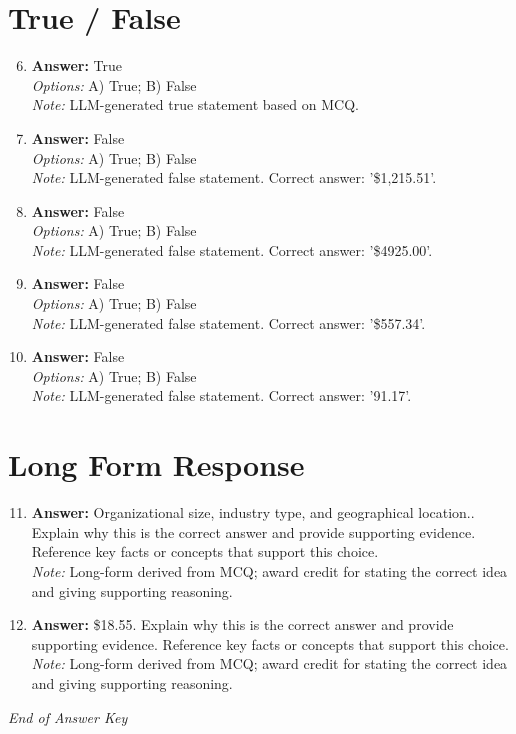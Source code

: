 \documentclass[12pt]{article}
\begin{document}
\section*{True / False}
\begin{enumerate}[label=\arabic*.]
\setcounter{enumi}{5}
\item \textbf{Answer:} True
\\ \textit{Options:} A) True; B) False
\\ \textit{Note:} LLM-generated true statement based on MCQ.
\item \textbf{Answer:} False
\\ \textit{Options:} A) True; B) False
\\ \textit{Note:} LLM-generated false statement. Correct answer: '\$1,215.51'.
\item \textbf{Answer:} False
\\ \textit{Options:} A) True; B) False
\\ \textit{Note:} LLM-generated false statement. Correct answer: '\$4925.00'.
\item \textbf{Answer:} False
\\ \textit{Options:} A) True; B) False
\\ \textit{Note:} LLM-generated false statement. Correct answer: '\$557.34'.
\item \textbf{Answer:} False
\\ \textit{Options:} A) True; B) False
\\ \textit{Note:} LLM-generated false statement. Correct answer: '91.17'.
\end{enumerate}

\section*{Long Form Response}
\begin{enumerate}[label=\arabic*.]
\setcounter{enumi}{10}
\item \textbf{Answer:} Organizational size, industry type, and geographical location.. Explain why this is the correct answer and provide supporting evidence. Reference key facts or concepts that support this choice.
\\ \textit{Note:} Long-form derived from MCQ; award credit for stating the correct idea and giving supporting reasoning.
\item \textbf{Answer:} \$18.55. Explain why this is the correct answer and provide supporting evidence. Reference key facts or concepts that support this choice.
\\ \textit{Note:} Long-form derived from MCQ; award credit for stating the correct idea and giving supporting reasoning.
\end{enumerate}

\vfill
\noindent\textit{End of Answer Key}
\end{document}
